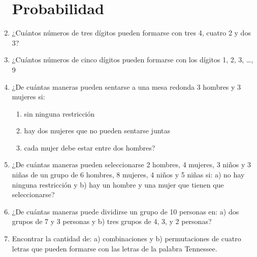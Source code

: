 \documentclass[letterpaper,twoside]{article}
\begin{document}
\begin{enumerate}
\section{Probabilidad}
\item ¿Cuántos números de tres dígitos pueden formarse con tres 4, cuatro 2 y dos 3?
\item ¿Cuántos números de cinco dígitos pueden formarse con los dígitos 1, 2, 3, \ldots, 9
\item ¿De cuántas maneras pueden sentarse a una mesa redonda 3 hombres y 3 mujeres si: 
\begin{enumerate}
\item sin ninguna restricción
\item hay dos mujeres que no pueden sentarse juntas
\item cada mujer debe estar entre dos hombres?
\end{enumerate} 
\item ¿De cuántas maneras pueden seleccionarse 2 hombres, 4 mujeres, 3 niños y 3 niñas de un grupo de 6 hombres, 8 mujeres, 4 niños y 5 niñas si: a) no hay ninguna restricción y b) hay un hombre y una mujer que tienen que seleccionarse?
\item ¿De cuántas maneras puede dividirse un grupo de 10 personas en: a) dos grupos de 7 y 3 personas y b) tres grupos de 4, 3, y 2 personas?
\item Encontrar la cantidad de: a) combinaciones y b) permutaciones de cuatro letras que pueden formarse con las letras de la palabra Tennessee.
\end{enumerate}
\end{document}
